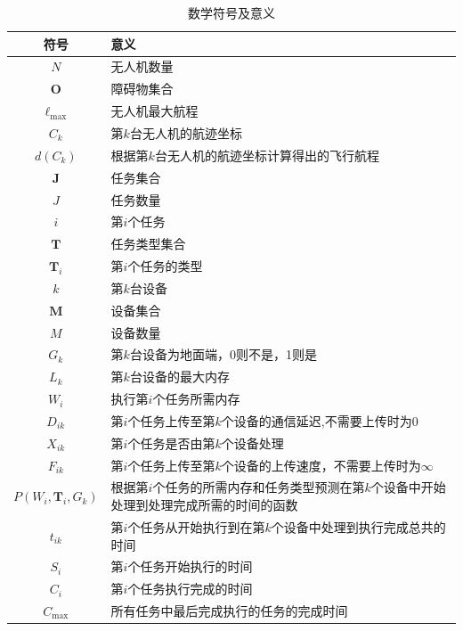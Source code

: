 \begin{longtable}{c C{0.8\textwidth}}
    \caption{数学符号及意义} 
    \label{tab:数学符号及意义} \\
    \hline
        \textbf{符号} & \textbf{意义}\\
    \hline
        \( N \) & 无人机数量 \\
        \( \mathbf{O} \) & 障碍物集合 \\
        \( \ell_\text{max} \) & 无人机最大航程 \\
        \( C_k \) & 第\( k \)台无人机的航迹坐标 \\
        \( d(C_k) \) & 根据第\( k \)台无人机的航迹坐标计算得出的飞行航程 \\
        \( \mathbf{J} \) & 任务集合 \\
        \( J \) & 任务数量 \\
        \( i \) & 第\( i \)个任务 \\
        \( \mathbf{T} \) & 任务类型集合 \\
        \( \mathbf{T}_i \) & 第\( i \)个任务的类型 \\
        \( k \) &  第\( k \)台设备 \\
        \( \mathbf{M} \) & 设备集合 \\
        \( M \) & 设备数量 \\
        \( G_k \) &  第\( k \)台设备为地面端，0则不是，1则是 \\
        \( L_k \) & 第\( k \)台设备的最大内存 \\
        \( W_i \) & 执行第\( i \)个任务所需内存 \\
        \( D_{i k} \) & 第\( i \)个任务上传至第\( k \)个设备的通信延迟,不需要上传时为\( 0 \) \\
        \( X_{i k} \) & 第\( i \)个任务是否由第\( k \)个设备处理 \\
        \( F_{i k} \) & 第\( i \)个任务上传至第\( k \)个设备的上传速度，不需要上传时为\( \infty \) \\
        \( P(W_i, \mathbf{T}_i, G_k) \) & 根据第\( i \)个任务的所需内存和任务类型预测在第\( k \)个设备中开始处理到处理完成所需的时间的函数 \\
        \( t_{i k} \) & 第\( i \)个任务从开始执行到在第\( k \)个设备中处理到执行完成总共的时间 \\
        \( S_{i} \) & 第\( i \)个任务开始执行的时间 \\
        \( C_{i} \) & 第\( i \)个任务执行完成的时间 \\
        \( C_{\text{max}} \) & 所有任务中最后完成执行的任务的完成时间 \\
    \hline
\end{longtable}

